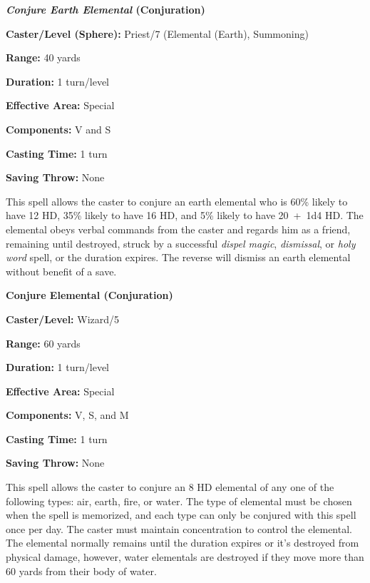 \begin{multicols}{2}
\vspace{1em}

\noindent
\begin{minipage}{\columnwidth}

\noindent \textbf{\textit{Conjure Earth Elemental} (Conjuration)}

\noindent \textbf{Caster/Level (Sphere):} Priest/7 (Elemental (Earth), Summoning)

\noindent \textbf{Range:} 40 yards

\noindent \textbf{Duration:} 1 turn/level

\noindent \textbf{Effective Area:} Special

\noindent \textbf{Components:} V and S

\noindent \textbf{Casting Time:} 1 turn

\noindent \textbf{Saving Throw:} None

\end{minipage}

This spell allows the caster to conjure an earth elemental who is 60\% likely to have 12 HD, 35\% likely to have 16 HD, and 5\% likely to have 20~+~1d4 HD.  The elemental obeys verbal commands from the caster and regards him as a friend, remaining until destroyed, struck by a successful \textit{dispel magic}, \textit{dismissal}, or \textit{holy word} spell, or the duration expires.  The reverse will dismiss an earth elemental without benefit of a save.

\vspace{1em}

\noindent
\begin{minipage}{\columnwidth}

\noindent \textbf{Conjure Elemental (Conjuration)}

\noindent \textbf{Caster/Level:} Wizard/5

\noindent \textbf{Range:} 60 yards

\noindent \textbf{Duration:} 1 turn/level

\noindent \textbf{Effective Area:} Special

\noindent \textbf{Components:} V, S, and M

\noindent \textbf{Casting Time:} 1 turn

\noindent \textbf{Saving Throw:} None

\end{minipage}

This spell allows the caster to conjure an 8 HD elemental of any one of the following types: air, earth, fire, or water.  The type of elemental must be chosen when the spell is memorized, and each type can only be conjured with this spell once per day. The caster must maintain concentration to control the elemental.  The elemental normally remains until the duration expires or it's destroyed from physical damage, however, water elementals are destroyed if they move more than 60 yards from their body of water.


\end{multicols}
